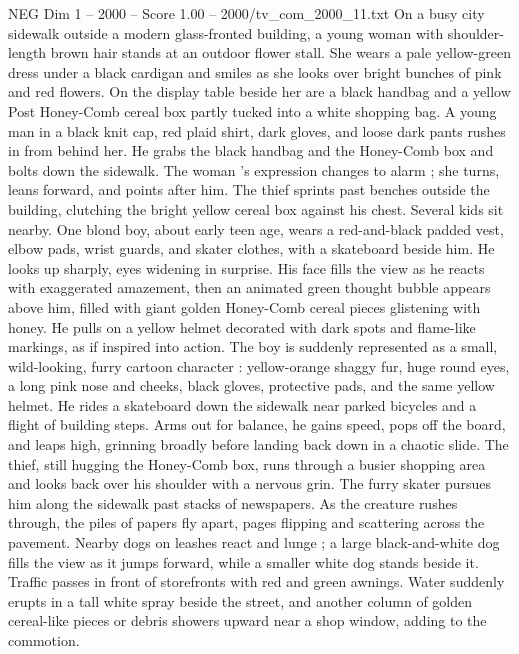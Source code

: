 \begin{textsample}{NEG Dim 1 – 2000 – Score 1.00 – 2000/tv\_com\_2000\_11.txt}  \label{ex:f1_neg_068}
On a busy city sidewalk outside a modern glass-fronted building, a young woman with shoulder-length brown hair stands at an outdoor flower stall.
She wears a pale yellow-green dress under a black cardigan and smiles as she looks over bright bunches of pink and red flowers.
On the display table beside her are a black handbag and a yellow Post Honey-Comb cereal box partly tucked into a white shopping bag.
A young man in a black knit cap, red plaid shirt, dark gloves, and loose dark pants rushes in from behind her.
He grabs the black handbag and the Honey-Comb box and bolts down the sidewalk.
The woman ’s expression changes to alarm ; she turns, leans forward, and points after him.
The thief sprints past benches outside the building, clutching the bright yellow cereal box against his chest.
Several kids sit nearby.
One blond boy, about early teen age, wears a red-and-black padded vest, elbow pads, wrist guards, and skater clothes, with a skateboard beside him.
He looks up sharply, eyes widening in surprise.
His face fills the view as he reacts with exaggerated amazement, then an animated green thought bubble appears above him, filled with giant golden Honey-Comb cereal pieces glistening with honey.
He pulls on a yellow helmet decorated with dark spots and flame-like markings, as if inspired into action.
The boy is suddenly represented as a small, wild-looking, furry cartoon character : yellow-orange shaggy fur, huge round eyes, a long pink nose and cheeks, black gloves, protective pads, and the same yellow helmet.
He rides a skateboard down the sidewalk near parked bicycles and a flight of building steps.
Arms out for balance, he gains speed, pops off the board, and leaps high, grinning broadly before landing back down in a chaotic slide.
The thief, still hugging the Honey-Comb box, runs through a busier shopping area and looks back over his shoulder with a nervous grin.
The furry skater pursues him along the sidewalk past stacks of newspapers.
As the creature rushes through, the piles of papers fly apart, pages flipping and scattering across the pavement.
Nearby dogs on leashes react and lunge ; a large black-and-white dog fills the view as it jumps forward, while a smaller white dog stands beside it.
Traffic passes in front of storefronts with red and green awnings.
Water suddenly erupts in a tall white spray beside the street, and another column of golden cereal-like pieces or debris showers upward near a shop window, adding to the commotion.

\end{textsample}
